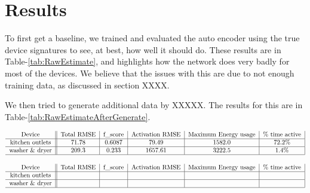 \documentclass{article}
\begin{document}
\section{Results}


To first get a baseline, we trained and evaluated the auto encoder using the true device signatures to see, at best, how well it should do.
These results are in Table-\ref{tab:RawEstimate}, and highlights how the network does very badly for most of the devices.
We believe that the issues with this are due to not enough training data, as discussed in section XXXX.

We then tried to generate additional data by XXXXX. The results for this are in Table-\ref{tab:RawEstimateAfterGenerate}.

\begin{table*}[t]
	\centering
	
$$\begin{tabular}{c||c|c|c|c|c|}
Device & Total RMSE & f\_score & Activation RMSE & Maximum Energy usage & \% time active\\ %
\hline
kitchen outlets & 71.78 & 0.6087 & 79.49  & 1582.0 & 72.2\% \\ %
\hline
washer \& dryer & 209.3 & 0.233 & 1657.61  & 3222.5 & 1.4\% \\ %
\hline
\end{tabular}$$
\label{tab:RawEstimate} 
\end{table*}

\begin{table*}[t]
	\centering
	
	$$\begin{tabular}{c||c|c|c|c|c|}
	Device & Total RMSE & f\_score & Activation RMSE & Maximum Energy usage & \% time active\\ %
	\hline
	kitchen outlets & &  &  & &  \\ %
	\hline
	washer \& dryer & &  &  & &  \\ %
	\hline
	\end{tabular}$$
	\label{tab:RawEstimateAfterGenerate} 
\end{table*}
\end{document}
